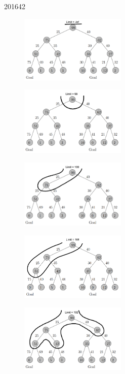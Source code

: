 \documentclass[10pt,\jkfside,a4paper]{article}
\begin{document}
\begin{examquestion}{2016}{4}{2}
\begin{enumerate}[label=(\alph*)]
\begin{figure}[H]
\centering
\includegraphics[width=0.45\textwidth]{searchtree1}
\end{figure}

\begin{figure}[H]
\centering
\includegraphics[width=0.45\textwidth]{searchtree2}
\end{figure}

\begin{figure}[H]
\centering
\includegraphics[width=0.45\textwidth]{searchtree3}
\end{figure}

\begin{figure}[H]
\centering
\includegraphics[width=0.45\textwidth]{searchtree4}
\end{figure}

\begin{figure}[H]
\centering
\includegraphics[width=0.45\textwidth]{searchtree5}
\end{figure}


\end{enumerate}
\end{examquestion}
\end{document}
